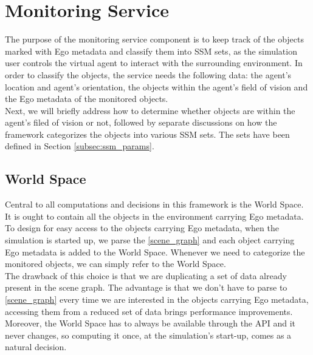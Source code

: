 \section{Monitoring Service} %
\label{sec:monitoring_service}
The purpose of the monitoring service component is to keep track of the objects marked with Ego metadata and classify them into SSM sets, as the simulation user controls the virtual agent to interact with the surrounding environment. In order to classify the objects, the service needs the following data: the agent's location and agent's orientation, the objects within the agent's field of vision and the Ego metadata of the monitored objects.\\

Next, we will briefly address how to determine whether objects are within the agent's filed of vision or not, followed by separate discussions on how the framework categorizes the objects into various SSM sets. The sets have been defined in Section \ref{subsec:ssm_params}.\\

\subsection{World Space}\label{subsec:world_space}
Central to all computations and decisions in this framework is the World Space. It is ought to contain all the objects in the environment carrying Ego metadata. To design for easy access to the objects carrying Ego metadata, when the simulation is started up, we parse the \ref{scene_graph} and each object carrying Ego metadata is added to the World Space. Whenever we need to categorize the monitored objects, we can simply refer to the World Space.\\

The drawback of this choice is that we are duplicating a set of data already present in the scene graph. The advantage is that we don't have to parse to \ref{scene_graph} every time we are interested in the objects carrying Ego metadata, accessing them from a reduced set of data brings performance improvements. Moreover, the World Space has to always be available through the API and it never changes, so computing it once, at the simulation's start-up, comes as a natural decision.

